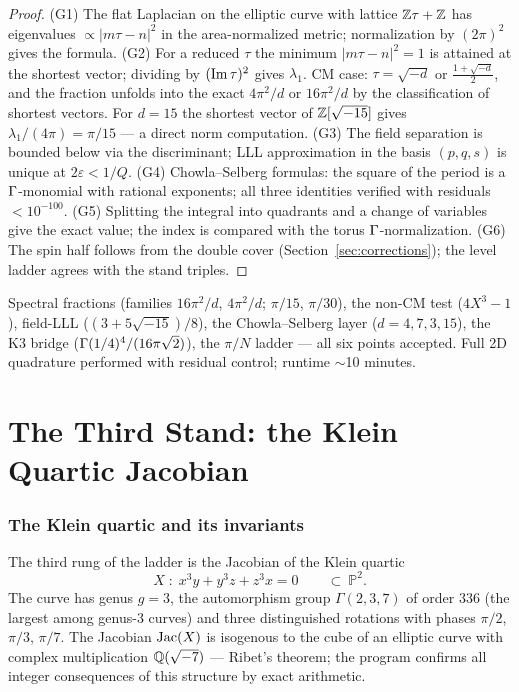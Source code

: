 \begin{proof}
(G1) The flat Laplacian on the elliptic curve with lattice
$\mathbb{Z}\tau+\mathbb{Z}$ has eigenvalues $\propto|m\tau-n|^2$ in the
area-normalized metric; normalization by $(2\pi)^2$ gives the
formula. (G2) For a reduced $\tau$ the minimum $|m\tau-n|^2=1$ is
attained at the shortest vector; dividing by $(\operatorname{Im}\tau)^2$ gives
$\lambda_1$. CM case: $\tau=\sqrt{-d}$ or $\tfrac{1+\sqrt{-d}}2$,
and the fraction unfolds into the exact $4\pi^2/d$ or $16\pi^2/d$ by
the classification of shortest vectors. For $d=15$ the shortest
vector of $\mathbb{Z}[\sqrt{-15}]$ gives $\lambda_1/(4\pi)=\pi/15$ --- a
direct norm computation. (G3) The field separation is bounded below
via the discriminant; LLL approximation in the basis $(p,q,s)$ is
unique at $2\varepsilon<1/Q$. (G4) Chowla--Selberg formulas: the
square of the period is a $\Gamma$-monomial with rational exponents;
all three identities verified with residuals $<10^{-100}$.
(G5) Splitting the integral into quadrants and a change of variables
give the exact value; the index is compared with the torus
$\Gamma$-normalization. (G6) The spin half follows from the double
cover (Section~\ref{sec:corrections}); the level ladder agrees with
the stand triples.
\end{proof}

\begin{statusbox}[certificate G]
Spectral fractions (families $16\pi^2/d$, $4\pi^2/d$; $\pi/15$,
$\pi/30$), the non-CM test ($4X^3-1$), field-LLL
($(3+5\sqrt{-15})/8$), the Chowla--Selberg layer ($d=4,7,3,15$),
the K3 bridge ($\Gamma(1/4)^4/(16\pi\sqrt2)$), the $\pi/N$ ladder ---
all six points accepted. Full 2D quadrature performed with residual
control; runtime $\sim$10 minutes.
\end{statusbox}

\part{The Third Stand: the Klein Quartic Jacobian}

\section{The Klein quartic and its invariants}\label{sec:klein}

The third rung of the ladder is the Jacobian of the Klein quartic
\[
  X\;:\; x^3y+y^3z+z^3x=0 \qquad \subset\ \mathbb{P}^2.
\]
The curve has genus $g=3$, the automorphism group $\Gamma(2,3,7)$ of
order $336$ (the largest among genus-3 curves) and three
distinguished rotations with phases $\pi/2$, $\pi/3$, $\pi/7$. The
Jacobian $\operatorname{Jac}(X)$ is isogenous to the cube of an elliptic curve
with complex multiplication $\mathbb{Q}(\sqrt{-7})$ --- Ribet's theorem;
the program confirms all integer consequences of this structure by
exact arithmetic.

